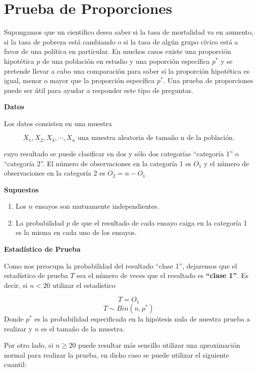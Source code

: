 \documentclass[
  a4paper,
  oneside,
  openany]{book}
\begin{document}
\hypertarget{prueba-de-proporciones}{%
\chapter{Prueba de Proporciones}\label{prueba-de-proporciones}}

Supongamos que un científico desea saber si la tasa de mortalidad va en aumento, si la tasa de pobreza está cambiando o si la tasa de algún grupo cívico está a favor de una política en particular. En muchos casos existe una proporción hipotética \(p\) de una población en estudio y una poporción específica \(p^*\) y se pretende llevar a cabo una comparación para saber si la proporción hipotética es igual, menor o mayor que la proporción específica \(p^*\).
Una prueba de proporciones puede ser útil para ayudar a responder este tipo de preguntas.

\textbf{Datos}

Los datos consisten en una muestra

\[X_{1},X_{2},X_{3},\cdots,X_{n}  \mbox{ una  muestra aleatoria  de  tamaño  n  de  la  población.}\]

cuyo resultado se puede clasificar en dos y sólo dos categorías ``categoría 1'' o ``categoría 2''. El número de observaciones en la categoría 1 es \(O_{1}\) y el número de observaciones en la categoría 2 es \(O_{2}=n-O_{1}\)

\textbf{Supuestos}

\begin{enumerate}
\def\labelenumi{\arabic{enumi})}
\item
  Los \(n\) ensayos son mutuamente independientes.
\item
  La probabilidad \(p\) de que el resultado de cada ensayo caiga en la categoría 1 es la misma en cada uno de los ensayos.
\end{enumerate}

\textbf{Estadístico de Prueba}

Como nos preocupa la probabilidad del resultado ``clase 1'', dejaremos que el estadístico de prueba \(T\) sea el número de veces que el resultado es \textbf{``clase 1''}.
Es decir, si \(n<20\) utilizar el estadístico

\[T=O_{1}\]
\[ T \sim Bin (n,p^*)\]
Donde \(p^*\) es la probabilidad especificada en la hipótesis nula de nuestra prueba a realizar y \(n\) es el tamaño de la muestra.

Por otro lado, si \(n\geq20\) puede resultar más sencillo utilizar una aproximación normal para realizar la prueba, en dicho caso se puede utilizar el siguiente cuantil:
\end{document}
